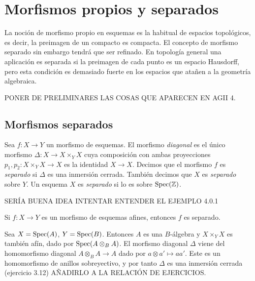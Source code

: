 \documentclass[GA.tex]{subfiles}
\begin{document}

\chapter{Morfismos propios y separados}

La noción de morfismo propio en esquemas es la habitual de espacios topológicos, es decir, la preimagen de un compacto es compacta. El concepto de morfismo separado sin embargo tendrá que ser refinado. En topología general una aplicación es separada si la preimagen de cada punto es un espacio Hausdorff, pero esta condición es demasiado fuerte en los espacios que atañen a la geometría algebraica. 


PONER DE PRELIMINARES LAS COSAS QUE APARECEN EN AGII 4. 
\section{Morfismos separados}


\begin{defi}
Sea $f:X\to Y$ un morfismo de esquemas. El morfismo \emph{diagonal} es el único morfismo $\Delta:X\to X\times_Y X$ cuya composición con ambas proyecciones $p_1,p_2:X\times_Y X\to X$ es la identidad $X\to X$. Decimos que el morfismo $f$ es \emph{separado} si $\Delta$ es una inmersión cerrada. También decimos que $X$ es \emph{separado} sobre $Y$. Un esquema $X$ es \emph{separado} si lo es sobre $\operatorname{Spec}(\mathbb{Z})$.  
\end{defi}

SERÍA BUENA IDEA INTENTAR ENTENDER EL EJEMPLO 4.0.1

\begin{prop}
Si $f:X\to Y$ es un morfismo de esquemas afines, entonces $f$ es separado.
\end{prop}
\begin{dem}
Sea $X=\operatorname{Spec}(A)$, $Y=\operatorname{Spec}(B)$. Entonces $A$ es una $B$-álgebra y $X\times_Y X$ es también afín, dado por $\operatorname{Spec}(A\otimes_B A)$. El morfismo diagonal $\Delta$ viene del homomorfismo diagonal $A\otimes_B A\to A$ dado por $a\otimes a'\mapsto aa'$. Este es un homomorfismo de anillos sobreyectivo, y por tanto $\Delta$ es una inmersión cerrada (ejercicio 3.12) AÑADIRLO A LA RELACIÓN DE EJERCICIOS.
\end{dem}
\end{document}
